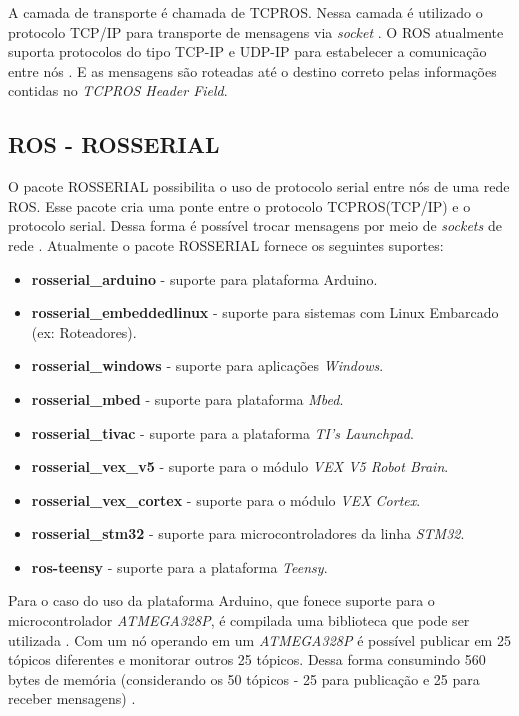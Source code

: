 A camada de transporte é chamada de TCPROS.
Nessa camada é utilizado o protocolo TCP/IP para transporte de mensagens via \textit{socket} \cite{tcpros2019}.
O ROS atualmente suporta protocolos do tipo TCP-IP e UDP-IP para estabelecer a comunicação entre nós \cite{rostopic2019}. 
E as mensagens são roteadas até o destino correto pelas informações contidas no \textit{TCPROS Header Field}.

\subsection{ROS - ROSSERIAL}

O pacote ROSSERIAL possibilita o uso de protocolo serial entre nós de uma rede ROS.
Esse pacote cria uma ponte entre o protocolo TCPROS(TCP/IP) e o protocolo serial. 
Dessa forma é possível trocar mensagens por meio de \textit{sockets} de rede \cite{fernandes_rosserial2019}. 
Atualmente o pacote ROSSERIAL fornece os seguintes suportes\cite{rosserial2019}:
\begin{itemize}
    \item \textbf{rosserial\_arduino} - suporte para plataforma Arduino.
    \item \textbf{rosserial\_embeddedlinux} - suporte para sistemas com Linux Embarcado (ex: Roteadores).
    \item \textbf{rosserial\_windows} - suporte para aplicações \textit{Windows}.
    \item \textbf{rosserial\_mbed} - suporte para plataforma \textit{Mbed}.
    \item \textbf{rosserial\_tivac} - suporte para a plataforma \textit{TI's Launchpad}.
    \item \textbf{rosserial\_vex\_v5} - suporte para o módulo \textit{VEX V5 Robot Brain}.
    \item \textbf{rosserial\_vex\_cortex} - suporte para o módulo \textit{VEX Cortex}.
    \item \textbf{rosserial\_stm32} - suporte para microcontroladores da linha \textit{STM32}.
    \item \textbf{ros-teensy} - suporte para a plataforma \textit{Teensy}.
\end{itemize}

Para o caso do uso da plataforma Arduino, que fonece suporte para o microcontrolador \textit{ATMEGA328P}, é compilada uma biblioteca que pode ser utilizada \cite{fernandes_rosserial2019}. 
Com um nó operando em um \textit{ATMEGA328P} é possível publicar em 25 tópicos diferentes e monitorar outros 25 tópicos. 
Dessa forma consumindo 560 bytes de memória (considerando os 50 tópicos - 25 para publicação e 25 para receber mensagens) \cite{arduinoros2019}. 

